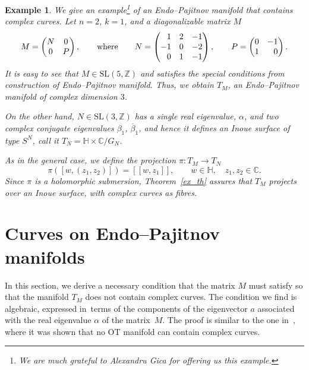 \documentclass[10pt,a4paper]{amsart}
\newcommand{\6}{\partial}
\numberwithin{equation}{section}
\newtheorem{Example}[Theorem]{Example}
\begin{document}
\begin{Example}\label{ex_curves}
We give an example\footnote{We are much grateful to Alexandru Gica for offering us this example.} of an Endo--Pajitnov manifold that contains complex curves.
Let $n=2$, $k=1$, and a diagonalizable matrix $M$
\[
M = \begin{pmatrix}
	N & 0 \\
	0 & P
\end{pmatrix},
\qquad
\text{where}\qquad
N= \begin{pmatrix}
\hphantom{-} 1 & 2 & -1\\
-1 & 0 & -2 \\
\hphantom{-} 0 & 1 & -1
\end{pmatrix}, \qquad
P=\begin{pmatrix}
0 & -1 \\
1 & \hphantom{-} 0
\end{pmatrix}.
\]
It is easy to see that $M \in \textrm{SL}(5, \mathbb{Z})$ and satisfies the special conditions from construction of Endo--Pajitnov manifold.
Thus, we obtain $T_M$, an Endo--Pajitnov manifold of complex dimension $3$.


On the other hand, $N\in \textrm{SL}(3, \mathbb{Z})$ has a single real eigenvalue, $\alpha$, and two complex conjugate eigenvalues $\beta_1$, $\overline{\beta}_1$, and hence it defines an Inoue surface of type $S^N$, call it $T_N=\mathbb{H} \times \mathbb{C}/G_N$.

As in the general case, we define the projection $\pi\colon T_M \longrightarrow T_N$
\[
\pi ([w,(z_1, z_2)])=[[w,z_1]], \qquad w \in \mathbb{H},\quad z_1, z_2 \in \mathbb{C}.
\]
Since $\pi$ is a holomorphic submersion, Theorem~\ref{ex_th} assures that $T_M$ projects over an Inoue surface, with complex curves as fibres.
\end{Example}

\section{Curves on Endo--Pajitnov manifolds}

In this section, we derive a necessary condition that the matrix $M$ must satisfy so that the manifold $T_M$ does not contain complex curves. The condition we find is algebraic, expressed in~terms of the components of the eigenvector $a$ associated with the real eigenvalue $\alpha$ of the matrix~$M$. The proof is similar to the one in~\cite{v_1}, where it was shown that no OT manifold can contain complex curves.
\end{document}

